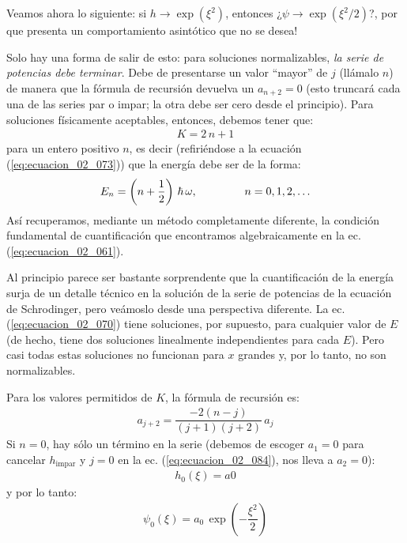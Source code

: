 Veamos ahora lo siguiente: si $h \to \exp \left( \xi^{2} \right)$, entonces ¿$\psi \to \exp \left( \xi^{2}/2 \right)$?, por que presenta un comportamiento asintótico que no se desea!
\par
Solo hay una forma de salir de esto: para soluciones normalizables, \textit{la serie de potencias debe terminar}. Debe de presentarse un valor \enquote{mayor} de $j$ (llámalo $n$) de manera que la fórmula de recursión devuelva un $a_{n+2} = 0$ (esto truncará cada una de las series par o impar; la otra debe ser cero desde el principio). Para soluciones físicamente aceptables, entonces, debemos tener que:
\begin{align*}
K = 2 \, n + 1
\end{align*}
para un entero positivo $n$, es decir (refiriéndose a la ecuación (\ref{eq:ecuacion_02_073})) que la energía debe ser de la forma:
\begin{align}
E_{n} = \left( n + \dfrac{1}{2} \right) \, \hbar \, \omega , \hspace{1.5cm} n = 0, 1, 2, \ldots
\label{eq:ecuacion_02_083}
\end{align}
Así recuperamos, mediante un método completamente diferente, la condición fundamental de cuantificación que encontramos algebraicamente en la ec. (\ref{eq:ecuacion_02_061}).
\par
Al principio parece ser bastante sorprendente que la cuantificación de la energía surja de un detalle técnico en la solución de la serie de potencias de la ecuación de Schrodinger, pero veámoslo desde una perspectiva diferente. La ec. (\ref{eq:ecuacion_02_070}) tiene soluciones, por supuesto, para cualquier valor de $E$ (de hecho, tiene dos soluciones linealmente independientes para cada $E$). Pero casi todas estas soluciones no funcionan para $x$ grandes y, por lo tanto, no son normalizables.
\par
Para los valores permitidos de $K$, la fórmula de recursión es:
\begin{align}
a_{j+2} = \dfrac{- 2 (n - j)}{(j + 1)(j + 2)} \, a_{j}
\label{eq:ecuacion_02_084}
\end{align}
Si $n = 0$, hay sólo un término en la serie (debemos de escoger $a_{1} = 0$ para cancelar $h_{\text{impar}}$ y $j = 0$ en la ec. (\ref{eq:ecuacion_02_084}), nos lleva a $a_{2} = 0$):
\begin{align*}
h_{0} (\xi) = a{0}
\end{align*}
y por lo tanto:
\begin{align*}
\psi_{0} (\xi) = a_{0} \, \exp \left( - \dfrac{\xi^{2}}{2} \right)
\end{align*}
